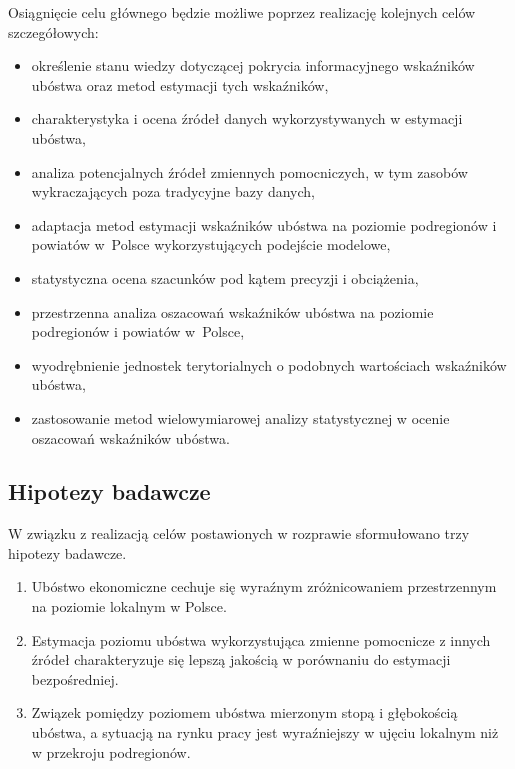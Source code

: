 Osiągnięcie celu głównego będzie możliwe poprzez realizację kolejnych celów szczegółowych:

\begin{itemize}
\item określenie stanu wiedzy dotyczącej pokrycia informacyjnego wskaźników ubóstwa oraz metod estymacji tych wskaźników,
\item charakterystyka i ocena źródeł danych wykorzystywanych w estymacji ubóstwa,
\item analiza potencjalnych źródeł zmiennych pomocniczych, w tym zasobów wykraczających poza tradycyjne bazy danych,
\item adaptacja metod estymacji wskaźników ubóstwa na poziomie podregionów i powiatów w~Polsce wykorzystujących podejście modelowe,
\item statystyczna ocena szacunków pod kątem precyzji i obciążenia,
\item przestrzenna analiza oszacowań wskaźników ubóstwa na poziomie podregionów i powiatów w~Polsce,
\item wyodrębnienie jednostek terytorialnych o podobnych wartościach wskaźników ubóstwa,
\item zastosowanie metod wielowymiarowej analizy statystycznej w ocenie oszacowań wskaźników ubóstwa.
\end{itemize}

\subsection*{Hipotezy badawcze}

W związku z realizacją celów postawionych w rozprawie sformułowano trzy hipotezy badawcze.

\begin{enumerate}
\item Ubóstwo ekonomiczne cechuje się wyraźnym zróżnicowaniem przestrzennym na poziomie lokalnym w Polsce.
\item Estymacja poziomu ubóstwa wykorzystująca zmienne pomocnicze z innych źródeł charakteryzuje się lepszą jakością w porównaniu do estymacji bezpośredniej.
\item Związek pomiędzy poziomem ubóstwa mierzonym stopą i głębokością ubóstwa, a sytuacją na rynku pracy jest wyraźniejszy w ujęciu lokalnym niż w przekroju podregionów.
\end{enumerate}

